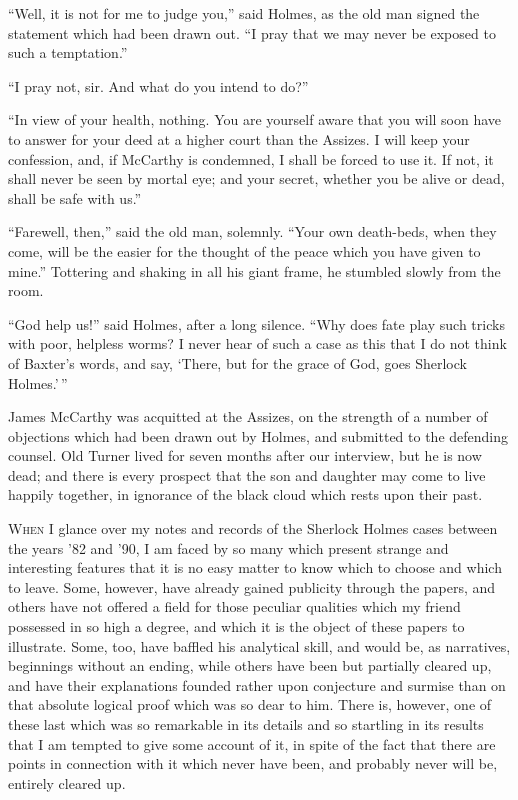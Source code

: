 “Well, it is not for me to judge you,” said Holmes, as the
old man signed the statement which had been drawn out.
“I pray that we may never be exposed to such a temptation.”

“I pray not, sir. And what do you intend to do?”

“In view of your health, nothing. You are yourself aware
that you will soon have to answer for your deed at a higher
court than the Assizes. I will keep your confession, and, if
McCarthy is condemned, I shall be forced to use it. If not,
it shall never be seen by mortal eye; and your secret, whether
you be alive or dead, shall be safe with us.”

“Farewell, then,” said the old man, solemnly. “Your own
death-beds, when they come, will be the easier for the thought
of the peace which you have given to mine.” Tottering and
shaking in all his giant frame, he stumbled slowly from the
room.

“God help us!” said Holmes, after a long silence. “Why
does fate play such tricks with poor, helpless worms? I never
hear of such a case as this that I do not think of Baxter’s
words, and say, ‘There, but for the grace of God, goes Sherlock
Holmes.’\,”

James McCarthy was acquitted at the Assizes, on the
strength of a number of objections which had been drawn out
by Holmes, and submitted to the defending counsel. Old
Turner lived for seven months after our interview, but he is
now dead; and there is every prospect that the son and
daughter may come to live happily together, in ignorance of
the black cloud which rests upon their past.


\textsc{When} I glance over my notes and records of the
Sherlock Holmes cases between the years ’82 and
’90, I am faced by so many which present strange
and interesting features that it is no easy matter
to know which to choose and which to leave. Some, however,
have already gained publicity through the papers, and
others have not offered a field for those peculiar qualities
which my friend possessed in so high a degree, and which it
is the object of these papers to illustrate. Some, too, have
baffled his analytical skill, and would be, as narratives,
beginnings without an ending, while others have been but partially
cleared up, and have their explanations founded rather upon
conjecture and surmise than on that absolute logical proof
which was so dear to him. There is, however, one of these
last which was so remarkable in its details and so startling in
its results that I am tempted to give some account of it, in
spite of the fact that there are points in connection with it
which never have been, and probably never will be, entirely
cleared up.

